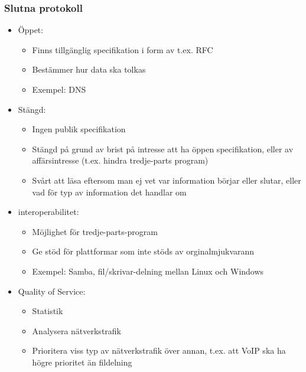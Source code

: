 \documentclass[xetex, 8pt]{beamer}
\begin{document}
    \begin{frame}
        \frametitle{Slutna protokoll}
        \begin{itemize}
            \item Öppet:
                \begin{itemize}
                    \item Finns tillgänglig specifikation i form av t.ex. RFC
                    \item Bestämmer hur data ska tolkas
                    \item Exempel: DNS
                \end{itemize}
            \item Stängd:
                \begin{itemize}
                    \item Ingen publik specifikation
                    \item Stängd på grund av brist på intresse att ha öppen
                        specifikation, eller av affärsintresse (t.ex. hindra
                        tredje-parts program)
                    \item Svårt att läsa eftersom man ej vet var information
                        börjar eller slutar, eller vad för typ av information
                        det handlar om
                \end{itemize}
        \end{itemize}

        \begin{itemize}
            \item interoperabilitet:
                \begin{itemize}
                    \item Möjlighet för tredje-parts-program
                    \item Ge stöd för plattformar som inte stöds av
                        orginalmjukvarann
                    \item Exempel: Samba, fil/skrivar-delning mellan
                        Linux och Windows
                \end{itemize}
            \item Quality of Service:
                \begin{itemize}
                    \item Statistik
                    \item Analysera nätverkstrafik
                    \item Prioritera viss typ av nätverkstrafik över annan,
                        t.ex. att VoIP ska ha högre prioritet än fildelning
                \end{itemize}
        \end{itemize}
    \end{frame}
\end{document}
